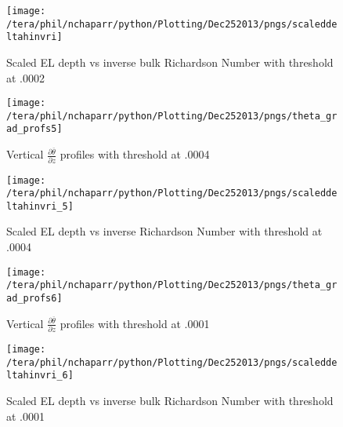 \begin{figure}[htbp]
\centering
 \texttt{[image: /tera/phil/nchaparr/python/Plotting/Dec252013/pngs/scaleddeltahinvri]}
       
        \caption{Scaled EL depth vs inverse bulk Richardson Number with threshold at .0002}
         \label{fig:scaledeltahinvri}
\end{figure}

\begin{figure}[htbp]
    \centering
    \texttt{[image: /tera/phil/nchaparr/python/Plotting/Dec252013/pngs/theta\_grad\_profs5]}
    \caption{Vertical $\frac{\partial \overline{\theta}}{\partial z}$ profiles with threshold at .0004}
    \label{fig:thresh1}   %
\end{figure}

\begin{figure}[htbp]
    \centering
    \texttt{[image: /tera/phil/nchaparr/python/Plotting/Dec252013/pngs/scaleddeltahinvri\_5]}
    \caption{Scaled EL depth vs inverse Richardson Number with threshold at .0004}
    \label{fig:scaledeltahinvri1}   %
\end{figure}

\begin{figure}[htbp]
    \centering
    \texttt{[image: /tera/phil/nchaparr/python/Plotting/Dec252013/pngs/theta\_grad\_profs6]}
    \caption{Vertical $\frac{\partial \overline{\theta}}{\partial z}$ profiles with threshold at .0001}
    \label{fig:thresh2}   %
\end{figure}

\begin{figure}[htbp]
    \centering
    \texttt{[image: /tera/phil/nchaparr/python/Plotting/Dec252013/pngs/scaleddeltahinvri\_6]}
    \caption{Scaled EL depth vs inverse bulk Richardson Number with threshold at .0001}
    \label{fig:scaledeltahinvri2}   %
\end{figure}

